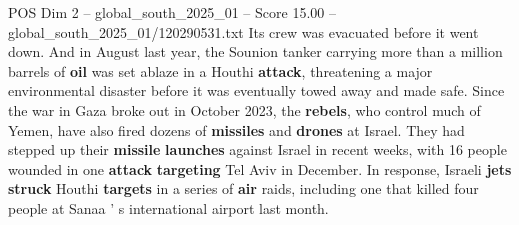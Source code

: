 \begin{textsample}{POS Dim 2 – global\_south\_2025\_01 – Score 15.00 – global\_south\_2025\_01/120290531.txt}
Its crew was evacuated before it went down.
And in August last year, the Sounion tanker carrying more than a million barrels of \textbf{oil} was set ablaze in a Houthi \textbf{attack}, threatening a major environmental disaster before it was eventually towed away and made safe.
Since the war in Gaza broke out in October 2023, the \textbf{rebels}, who control much of Yemen, have also fired dozens of \textbf{missiles} and \textbf{drones} at Israel.
They had stepped up their \textbf{missile} \textbf{launches} against Israel in recent weeks, with 16 people wounded in one \textbf{attack} \textbf{targeting} Tel Aviv in December.
In response, Israeli \textbf{jets} \textbf{struck} Houthi \textbf{targets} in a series of \textbf{air} raids, including one that killed four people at Sanaa ' s international airport last month.

\end{textsample}
